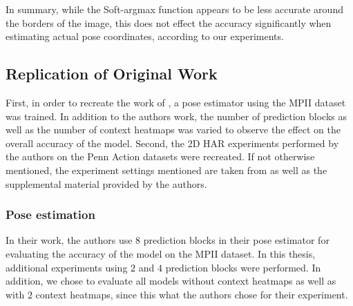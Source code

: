 \begin{table}[]
    \centering
    \caption{Mean average accuracy (in percent) of Soft-argmax when detecting ground truth coordinates from synthetic joint heatmaps. Threshold referrs to the amound of pixels the estimate is allowed to deviate from the ground truth annotation. $c$ referres to the covariance used for creating the synthetic heatmaps. The large discrepancy between a threshold of $1$ and a threshold of $2$ is most likely due to rounding errors.}
    \label{tab:softargmax_numeric_eval}
\end{table}

In summary, while the Soft-argmax function appears to be less accurate around the borders of the image, this does not effect the accuracy significantly when estimating actual pose coordinates, according to our experiments.

\subsection{Replication of Original Work}
\label{sec:exp-replication}

First, in order to recreate the work of \cite{luvizon_2d/3d_2018}, a pose estimator using the MPII dataset was trained.
In addition to the authors work, the number of prediction blocks as well as the number of context heatmaps was varied to observe the effect on the overall accuracy of the model.
Second, the 2D HAR experiments performed by the authors on the Penn Action datasets were recreated.
If not otherwise mentioned, the experiment settings mentioned are taken from \cite{luvizon_2d/3d_2018} as well as the supplemental material provided by the authors.

\subsubsection{Pose estimation}
In their work, the authors use $8$ prediction blocks in their pose estimator for evaluating the accuracy of the model on the MPII dataset.
In this thesis, additional experiments using $2$ and $4$ prediction blocks were performed.
In addition, we chose to evaluate all models without context heatmaps as well as with $2$ context heatmaps, since this what the authors chose for their experiment.

